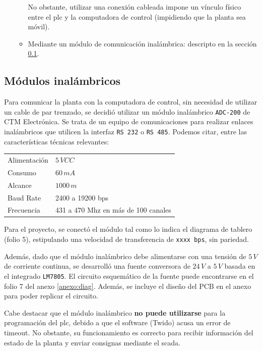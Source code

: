 \begin{itemize}
\begin{itemize}
No obstante, utilizar una conexión cableada impone un vínculo físico entre
el \gls{plc} y la computadora de control (impidiendo que la planta sea móvil).
\item Mediante un módulo de comunicación inalámbrica:
descripto en la sección \ref{subsec:inalambrico}.
\end{itemize}

\end{itemize}

\subsection{Módulos inalámbricos}
\label{subsec:inalambrico}

Para comunicar la planta con la computadora de control, sin necesidad de
utilizar un cable de par trenzado, se decidió utilizar un módulo inalámbrico
\verb|ADC-200| de CTM Electrónica.
Se trata de un equipo de comunicaciones para realizar enlaces inalámbricos que
utilicen la interfaz \verb|RS 232| o \verb|RS 485|.
Podemos citar, entre las características técnicas relevantes:

\begin{center}
\begin{tabular}{|l|l|}
\hline
Alimentación & $5\,VCC$\\
Consumo& $60\,mA$\\
Alcance& $1000\,m$\\
Baud Rate &2400 a 19200 bps \\
Frecuencia& 431 a 470 Mhz en más de 100 canales\\
\hline
\end{tabular}
\end{center}

Para el proyecto, se conectó el módulo tal como lo indica el
diagrama de tablero (folio 5), estipulando una velocidad de transferencia de
\verb|xxxx bps|, sin pariedad.

Además, dado que el módulo inalámbrico debe alimentarse con una tensión de
$5\,V$ de corriente continua, se desarrolló una fuente conversora de $24\,V$ a
$5\,V$ basada en el integrado \verb|LM7805|.
El circuito esquemático de la fuente puede encontrarse en el folio 7 del anexo
\ref{anexo:diag}.
Además, se incluye el diseño del PCB en el anexo  para poder
replicar el circuito.

Cabe destacar que el módulo inalámbrico \textbf{no puede utilizarse} para
la programación del \gls{plc}, debido a que el software (Twido) acusa un error
de timeout.
No obstante, su funcionamiento es correcto para recibir información
del estado de la planta y enviar consignas mediante el \gls{scada}.

